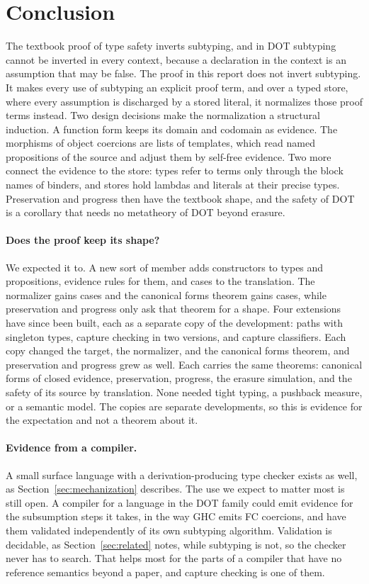 \mathplain
\section{Conclusion}\label{sec:conclusion}

The textbook proof of type safety inverts subtyping, and in DOT subtyping cannot be inverted in every context, because a declaration in the context is an assumption that may be false. The proof in this report does not invert subtyping. It makes every use of subtyping an explicit proof term, and over a typed store, where every assumption is discharged by a stored literal, it normalizes those proof terms instead. Two design decisions make the normalization a structural induction. A function form keeps its domain and codomain as evidence. The morphisms of object coercions are lists of templates, which read named propositions of the source and adjust them by self-free evidence. Two more connect the evidence to the store: types refer to terms only through the block names of binders, and stores hold lambdas and literals at their precise types. Preservation and progress then have the textbook shape, and the safety of DOT is a corollary that needs no metatheory of DOT beyond erasure.

\paragraph{Does the proof keep its shape?}
We expected it to. A new sort of member adds constructors to types and propositions, evidence rules for them, and cases to the translation. The normalizer gains cases and the canonical forms theorem gains cases, while preservation and progress only ask that theorem for a shape. Four extensions have since been built, each as a separate copy of the development: paths with singleton types, capture checking in two versions, and capture classifiers. Each copy changed the target, the normalizer, and the canonical forms theorem, and preservation and progress grew as well. Each carries the same theorems: canonical forms of closed evidence, preservation, progress, the erasure simulation, and the safety of its source by translation. None needed tight typing, a pushback measure, or a semantic model. The copies are separate developments, so this is evidence for the expectation and not a theorem about it.

\paragraph{Evidence from a compiler.}
A small surface language with a derivation-producing type checker exists as well, as Section~\ref{sec:mechanization} describes. The use we expect to matter most is still open. A compiler for a language in the DOT family could emit evidence for the subsumption steps it takes, in the way GHC emits FC coercions, and have them validated independently of its own subtyping algorithm. Validation is decidable, as Section~\ref{sec:related} notes, while subtyping is not, so the checker never has to search. That helps most for the parts of a compiler that have no reference semantics beyond a paper, and capture checking is one of them.

